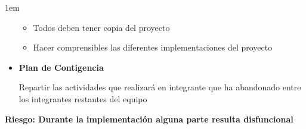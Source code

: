 \documentclass[12pt, fleqn]{report}                             %
\newenvironment{SmallIndentation}[1][0.75em]                    %
    {\begin{adjustwidth}{#1}{}\begin{footnotesize}}                 %
    {\end{footnotesize}\end{adjustwidth}}                           %
\begin{document}
\begin{SmallIndentation}[1em]
\begin{itemize}
\begin{itemize}
                                \item
                                    Todos deben tener copia del proyecto

                                \item
                                    Hacer comprensibles las diferentes
                                    implementaciones del proyecto 
                            \end{itemize}

                        \item
                            \textbf{Plan de Contigencia}

                                Repartir las actividades que realizará en 
                                integrante que ha abandonado entre los 
                                integrantes restantes del equipo


                    \end{itemize}
                
                \end{SmallIndentation}


            \textbf{Riesgo: Durante la implementación alguna parte resulta
            disfuncional}
\end{document}
